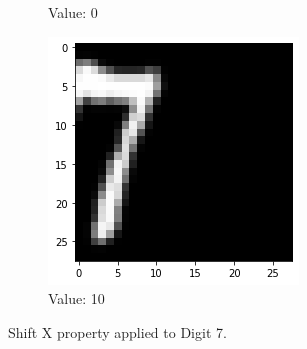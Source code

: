 \begin{figure}[htb!]
\begin{subfigure}[b]{.3\textwidth}
            \caption{Value: 0}
            \label{fig:Rotate-misclass0}
        \end{subfigure}%
        \begin{subfigure}[b]{.3\textwidth}
            \centering
            \includegraphics[width=\linewidth]{images/shiftx3.png}
            \caption{Value: 10}
            \label{fig:Rotate-misclass0}
        \end{subfigure}
        
        \caption{Shift X property applied to Digit 7.}
        \label{fig:Rotate-misclassifications}
    \end{figure}
    \FloatBarrier
    
